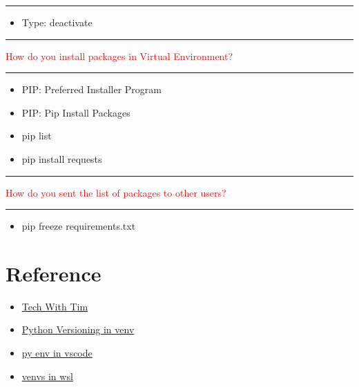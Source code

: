 \documentclass{article}
\begin{document}
\noindent
{\color{red} \rule{\linewidth}{0.5mm}}
\begin{itemize}
    \item Type: deactivate
\end{itemize}
\noindent
{\color{red} \rule{\linewidth}{0.5mm}}
\textcolor{red}{How do you install packages in  Virtual Environment?} \\
\noindent
{\color{red} \rule{\linewidth}{0.5mm}}
\begin{itemize}
    \item PIP: Preferred Installer Program
    \item PIP: Pip Install Packages
    \item pip list
    \item pip install requests
\end{itemize}

\noindent
{\color{red} \rule{\linewidth}{0.5mm}}
\textcolor{red}{How do you sent the list of packages to other users?} \\
\noindent
{\color{red} \rule{\linewidth}{0.5mm}}
\begin{itemize}
    \item pip freeze \textrangle requirements.txt
\end{itemize}
\section{Reference}
\begin{itemize}
    \item \href{https://www.youtube.com/watch?v=Y21OR1OPC9As}{Tech With Tim}
    \item \href{https://packaging.python.org/en/latest/guides/installing-using-pip-and-virtual-environments/}{Python Versioning in venv}
    \item \href{https://stackoverflow.com/questions/68376749/problems-installing-python-packages-into-a-virtual-environment-in-visual-studio}{py env in vscode}
    \item \href{https://stackoverflow.com/questions/61528500/installing-venv-for-python3-in-wsl-ubuntu}{venvs in wsl}
\end{itemize}
\end{document}
